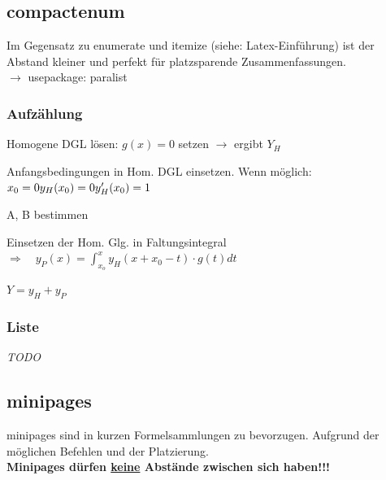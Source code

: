 	\subsection{compactenum}
		Im Gegensatz zu enumerate und itemize (siehe: Latex-Einführung) ist der Abstand kleiner und perfekt für platzsparende Zusammenfassungen.\\
		$\rightarrow$ usepackage: paralist
		
			\subsubsection{Aufzählung}
					\begin{compactenum}
						\item Homogene DGL lösen: $g(x)=0$ setzen $\rightarrow$ ergibt $Y_H$
						\item Anfangsbedingungen in Hom. DGL einsetzen. Wenn möglich: $x_0=0\quad \newline 
						y_H(x_0)=0 \newline  y_H'(x_0)=1 \qquad$
						\item A, B bestimmen
						\item  Einsetzen der Hom. Glg. in Faltungsintegral 
						$\Rightarrow\quad y_P(x)=\int_{x_o}^{x} y_H(x+x_0-t)\cdot g(t)dt$
						\item $Y=y_H+y_P$
					\end{compactenum}
			
			\subsubsection{Liste}
				\textit{{\color{red}TODO}}		%
				
	
	\subsection{minipages}
		minipages sind in kurzen Formelsammlungen zu bevorzugen. Aufgrund der möglichen Befehlen und der Platzierung.\\
		\textbf{Minipages dürfen \underline{keine} Abstände zwischen sich haben!!!}\\[1cm]		%
		
